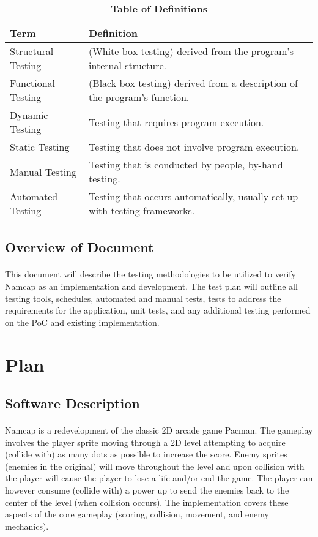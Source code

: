 \documentclass[12pt, titlepage]{article}
\begin{document}
\begin{table}[!htbp]
\caption{\textbf{Table of Definitions}} \label{Table}

\begin{tabularx}{\textwidth}{p{3cm}X}
\toprule
\textbf{Term} & \textbf{Definition}\\
\midrule
Structural Testing & (White box testing) derived from the program's internal structure.\\
Functional Testing & (Black box testing) derived from a description of the program's function.\\
Dynamic Testing & Testing that requires program execution.\\
Static Testing & Testing that does not involve program execution.\\
Manual Testing & Testing that is conducted by people, by-hand testing.\\
Automated Testing & Testing that occurs automatically, usually set-up with testing frameworks.\\
\bottomrule
\end{tabularx}

\end{table}	

\subsection{Overview of Document}
\paragraph{}
This document will describe the testing methodologies to be utilized to verify Namcap as an implementation and development. The test plan will outline all testing tools, schedules, automated and manual tests, tests to address the requirements for the application, unit tests, and any additional testing performed on the PoC and existing implementation.

\section{Plan}
	
\subsection{Software Description}
\paragraph{}
Namcap is a redevelopment of the classic 2D arcade game Pacman. The gameplay involves the player sprite moving through a 2D level attempting to acquire (collide with) as many dots as possible to increase the score. Enemy sprites (enemies in the original) will move throughout the level and upon collision with the player will cause the player to lose a life and/or end the game. The player can however consume (collide with) a power up to send the enemies back to the center of the level (when collision occurs). The implementation covers these aspects of the core gameplay (scoring, collision, movement, and enemy mechanics).
\end{document}
